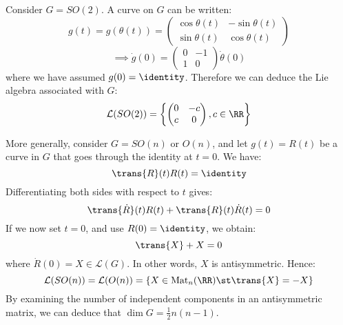 \documentclass{jknotes}
\begin{document}
\begin{eg}
    Consider \(G=SO(2)\). A curve on \(G\) can be written:
    \begin{equation}
        g(t)=g(\theta(t))=
        \begin{pmatrix}
            \cos\theta(t) & -\sin\theta(t) \\
            \sin\theta(t) & \cos\theta(t)
        \end{pmatrix}
    \end{equation}
    \begin{equation}
        \implies \dot{g}(0)=
        \begin{pmatrix}
            0 & -1 \\
            1 & 0
        \end{pmatrix}
        \dot{\theta}(0)
    \end{equation}
    where we have assumed \(g(0)=\identity\). Therefore we can deduce the Lie algebra associated with \(G\):
    \begin{equation}
        \mathcal{L}(SO(2)) = \left\{ 
        \begin{pmatrix}
            0 & -c \\
            c & 0
        \end{pmatrix},
        c \in \RR
        \right\}
    \end{equation}
\end{eg}

\begin{eg}
    More generally, consider \(G=SO(n)\) or \(O(n)\), and let \(g(t)=R(t)\) be a curve in \(G\) that goes through the identity at \(t=0\). We have:
    \begin{equation}
        \trans{R}(t)R(t) = \identity
    \end{equation}
    Differentiating both sides with respect to \(t\) gives:
    \begin{equation}
        \trans{\dot{R}}(t) R(t) + \trans{R}(t) \dot{R}(t) = 0
    \end{equation}
    If we now set \(t=0\), and use \(R(0)=\identity\), we obtain:
    \begin{equation}
        \trans{X} + X = 0
    \end{equation}
    where \(\dot{R}(0) = X \in \mathcal{L}(G)\). In other words, \(X\) is antisymmetric. Hence:
    \begin{equation}
        \mathcal{L}(SO(n))=\mathcal{L}(O(n))=\{X\in\operatorname{Mat}_n(\RR)\st\trans{X}=-X\}
    \end{equation}
    By examining the number of independent components in an antisymmetric matrix, we can deduce that \(\dim G=\frac{1}{2}n(n-1)\).
\end{eg}
\end{document}
